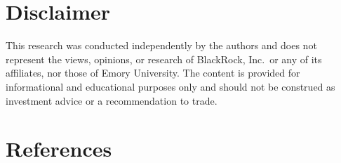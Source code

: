 \documentclass[,11pt,letterpaper,twocolumn]{article}
\begin{document}
\section*{Disclaimer}
This research was conducted independently by the authors and does not
represent the views, opinions, or research of BlackRock, Inc.~or any of
its affiliates, nor those of Emory University. The content is provided
for informational and educational purposes only and should not be
construed as investment advice or a recommendation to trade.

\section*{References}\label{references}

\protect{}\label{refs}
\end{document}
